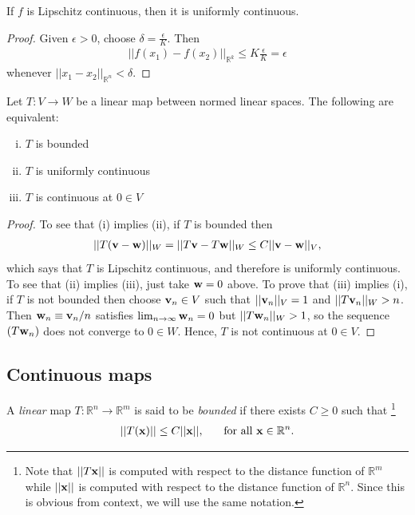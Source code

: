 \documentclass[12pt,letterpaper,reqno]{article}
\numberwithin{equation}{section}
\newcommand{\R}{\ensuremath{\mathbb R}}
\newcommand{\bv}{{\bf v}}
\newcommand{\bw}{{\bf w}}
\newcommand{\bx}{{\bf x}}
\begin{document}
{\begin{lem}
If $f$ is Lipschitz continuous, then it is uniformly continuous.	
\end{lem}

\begin{proof}
	Given $\epsilon>0$, choose $\delta=\frac{\epsilon}{K}$. Then
	\begin{align*}
		||f(x_1)-f(x_2)||_{\R^k}\leq K \frac{\epsilon}{K}=\epsilon
	\end{align*}
	whenever $||x_1-x_2||_{\R^n}<\delta$.
\end{proof}


\begin{thm}
Let $T:V \to W$ be a linear map between normed linear spaces. The following are equivalent:
\begin{enumerate}[(i)]
	\item $T$ is bounded
	\item $T$ is uniformly continuous
	\item $T$ is continuous at $0 \in V$
\end{enumerate}	
\end{thm}

\begin{proof}
	To see that (i) implies (ii), if $T$ is bounded then
	\begin{align*}
		||T(\bv-\bw)||_W=||T\bv-T\bw||_W \leq C||\bv-\bw||_V,
	\end{align*}
	which says that $T$ is Lipschitz continuous, and therefore is uniformly continuous. To see that (ii) implies (iii), just take $\bw=0$ above. To prove that (iii) implies (i), if $T$ is not bounded then choose $\bv_n \in V$ such that $||\bv_n||_V=1$ and $||T\bv_n||_W>n$. Then $\bw_n\equiv \bv_n/n$ satisfies $\lim_{n \to \infty}\bw_n=0$ but $||T\bw_n||_W>1$, so the sequence $(T\bw_n)$ does not converge to $0 \in W$. Hence, $T$ is not continuous at $0 \in V$.
\end{proof}


\subsection{Continuous maps}
\begin{defn}
	A \emph{linear} map $T:\R^n \to \R^m$ is said to be \emph{bounded} if there exists $C\geq 0$ such that \footnote{Note that $||T\bx||$ is computed with respect to the distance function of $\R^m$ while $||\bx||$ is computed with respect to the distance function of $\R^n$. Since this is obvious from context, we will use the same notation.}
	\begin{align}\label{eq:bounded_op}
		||T(\bx)||\leq C||\bx||, \hspace{0.5cm} \text{ for all } \bx \in \R^n.
	\end{align}
\end{defn}

}
\end{document}
